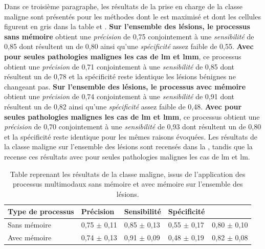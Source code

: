 Dans ce troisième paragraphe, les résultats de la prise en charge de la classe maligne sont présentés pour les méthodes dont le \fscore{} est maximisé et dont les cellules figurent en gris dans la table  et . \textbf{Sur l'ensemble des lésions, le \textbf{processus sans mémoire}} obtient une \textit{précision} de 0,75 conjointement à une \textit{sensibilité} de 0,85 dont résultent un \fscore{} de 0,80 ainsi qu'une \textit{spécificité} assez faible de 0,55. \textbf{Avec pour seules pathologies malignes les cas de \gls{lm} et \gls{lmm}}, ce processus obtient une \textit{précision} de 0,71 conjointement à une \textit{sensibilité} de 0,85 dont résultent un \fscore{} de 0,78 et la spécificité reste identique les lésions bénignes ne changeant pas. \textbf{Sur l'ensemble des lésions, le \textbf{processus avec mémoire}} obtient une \textit{précision} de 0,74 conjointement à une \textit{sensibilité} de 0,91 dont résultent un \fscore{} de 0,82 ainsi qu'une \textit{spécificité} assez faible de 0,48. \textbf{Avec pour seules pathologies malignes les cas de \gls{lm} et \gls{lmm}}, ce processus obtient une \textit{précision} de 0,70 conjointement à une \textit{sensibilité} de 0,93 dont résultent un \fscore{} de 0,80 et la spécificité reste identique pour les mêmes raisons évoquées. Les résultats de la classe maligne sur l'ensemble des lésions sont recensés dans la , tandis que la  recense ces résultats avec pour seules pathologies malignes les cas de \gls{lm} et \gls{lm}.\par

\begin{table}[H]
    \centering
    \begin{tabular}{lllll}
        \toprule 
        Type de processus   & Précision             & Sensibilité           & Spécificité           & \Fscore{}             \\ \midrule
        Sans mémoire        & 0,75 $\pm$ 0,11 	    & 0,85 $\pm$ 0,13 	    & 0,55 $\pm$ 0,17 	    & 0,80 $\pm$ 0,10         \\ \midrule
        Avec mémoire        & 0,74 $\pm$ 0,13 	    & 0,91 $\pm$ 0,09 	    & 0,48 $\pm$ 0,19 	    & 0,82 $\pm$ 0,08         \\ \bottomrule
    \end{tabular}
    \caption{Table reprenant les résultats de la classe maligne, issus de l'application des processus multimodaux sans mémoire et avec mémoire sur l'ensemble des lésions.}
    \label{tab:results_multimodal_process_malignant}
\end{table}

